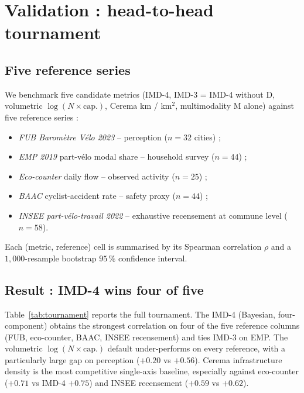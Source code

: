 \documentclass[11pt,a4paper]{article}
\begin{document}
\section{Validation : head-to-head tournament}
\label{sec:tournament}

\subsection{Five reference series}

We benchmark five candidate metrics
(IMD-4, IMD-3 = IMD-4 without D, volumetric $\log(N \times \text{cap.})$,
Cerema km / km$^2$, multimodality M alone)
against five reference series :

\begin{itemize}[label=$\bullet$,leftmargin=*]
    \item \emph{FUB Barom\`etre V\'elo 2023} -- perception ($n=32$
          cities) ;
    \item \emph{EMP 2019} part-v\'elo modal share -- household
          survey ($n=44$) ;
    \item \emph{Eco-counter} daily flow -- observed activity ($n=25$) ;
    \item \emph{BAAC} cyclist-accident rate -- safety proxy
          \citep{Reynolds2009,Schepers2014} ($n=44$) ;
    \item \emph{INSEE part-v\'elo-travail 2022} -- exhaustive
          recensement at commune level ($n=58$).
\end{itemize}

Each (metric, reference) cell is summarised by its Spearman
correlation $\rho$ and a $1{,}000$-resample bootstrap $95\,\%$
confidence interval.

\subsection{Result : IMD-4 wins four of five}

Table~\ref{tab:tournament} reports the full tournament.
The IMD-4 (Bayesian, four-component) obtains the strongest
correlation on four of the five reference columns (FUB,
eco-counter, BAAC, INSEE recensement) and ties IMD-3 on EMP.
The volumetric $\log(N \times \text{cap.})$ default
under-performs on every reference, with a particularly large gap
on perception ($+0.20$ vs $+0.56$).  Cerema infrastructure
density is the most competitive single-axis baseline, especially
against eco-counter ($+0.71$ vs IMD-4 $+0.75$) and INSEE recensement
($+0.59$ vs $+0.62$).
\end{document}
